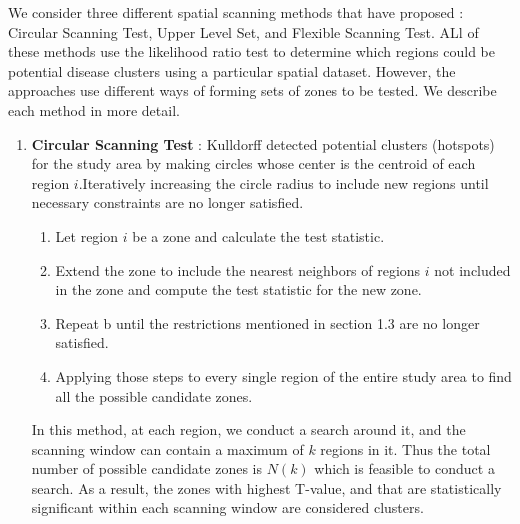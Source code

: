 \documentclass[12pt]{article}
\begin{document}
				We consider three different spatial scanning methods that have proposed : Circular Scanning Test, Upper Level Set, and Flexible Scanning Test. ALl of these methods use the likelihood ratio test to determine which regions could be potential disease clusters using a particular spatial dataset. However, the approaches use different ways of forming sets of zones to be tested. We describe each method in more detail.\\			
				\begin{enumerate}
			\item \textbf{Circular Scanning Test} : Kulldorff detected potential clusters (hotspots) for the study area by making circles whose center is the centroid of each region $i$.Iteratively increasing the circle radius to include new regions until necessary constraints are no longer satisfied. 
	
			\begin{enumerate}
				\item Let region $i$ be a zone and calculate the test statistic. 
				\item Extend the zone to include the nearest neighbors of regions $i$ not included in the zone and compute the test statistic for the new zone. 
				\item Repeat b until the restrictions mentioned in section 1.3 are no longer satisfied.  
				\item Applying those steps to every single region of the entire study area to find all the possible candidate zones. 
			\end{enumerate}  
		In this method, at each region, we conduct a search around it, and the scanning window can contain a maximum of $k$ regions in it. Thus the total number of possible candidate zones is $N(k)$ which is feasible to conduct a search.
		As a result, the zones with highest T-value, and that are statistically significant within each scanning window are considered clusters. \\
			

\end{enumerate}
\end{document}
